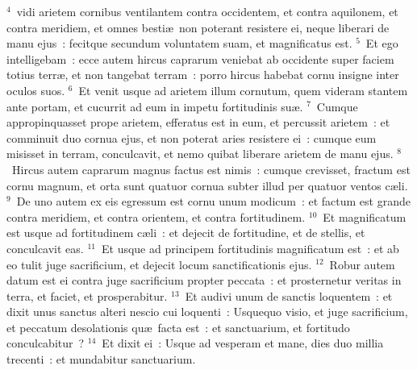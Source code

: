 ${}^{4}$~vidi arietem cornibus ventilantem contra occidentem, et contra aquilonem, et contra meridiem, et omnes besti\ae\ non poterant resistere ei, neque liberari de manu ejus~: fecitque secundum voluntatem suam, et magnificatus est.
${}^{5}$~Et ego intelligebam~: ecce autem hircus caprarum veniebat ab occidente super faciem totius terr\ae , et non tangebat terram~: porro hircus habebat cornu insigne inter oculos suos.
${}^{6}$~Et venit usque ad arietem illum cornutum, quem videram stantem ante portam, et cucurrit ad eum in impetu fortitudinis su\ae .
${}^{7}$~Cumque appropinquasset prope arietem, efferatus est in eum, et percussit arietem~: et comminuit duo cornua ejus, et non poterat aries resistere ei~: cumque eum misisset in terram, conculcavit, et nemo quibat liberare arietem de manu ejus.
${}^{8}$~Hircus autem caprarum magnus factus est nimis~: cumque crevisset, fractum est cornu magnum, et orta sunt quatuor cornua subter illud per quatuor ventos c\ae li.
${}^{9}$~De uno autem ex eis egressum est cornu unum modicum~: et factum est grande contra meridiem, et contra orientem, et contra fortitudinem.
${}^{10}$~Et magnificatum est usque ad fortitudinem c\ae li~: et dejecit de fortitudine, et de stellis, et conculcavit eas.
${}^{11}$~Et usque ad principem fortitudinis magnificatum est~: et ab eo tulit juge sacrificium, et dejecit locum sanctificationis ejus.
${}^{12}$~Robur autem datum est ei contra juge sacrificium propter peccata~: et prosternetur veritas in terra, et faciet, et prosperabitur.
${}^{13}$~Et audivi unum de sanctis loquentem~: et dixit unus sanctus alteri nescio cui loquenti~: Usquequo visio, et juge sacrificium, et peccatum desolationis qu\ae\ facta est~: et sanctuarium, et fortitudo conculcabitur~?
${}^{14}$~Et dixit ei~: Usque ad vesperam et mane, dies duo millia trecenti~: et mundabitur sanctuarium.



